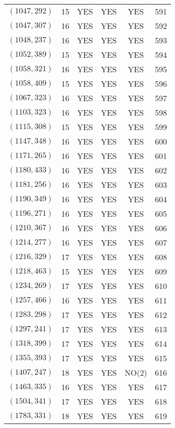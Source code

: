 \begin{longtable}{|c|c|c|c|c|c|}
$(1047, 292)$ & 15 & YES & YES & YES & 591\\
$(1047, 307)$ & 16 & YES & YES & YES & 592\\
$(1048, 237)$ & 16 & YES & YES & YES & 593\\
$(1052, 389)$ & 15 & YES & YES & YES & 594\\
$(1058, 321)$ & 16 & YES & YES & YES & 595\\
$(1058, 409)$ & 15 & YES & YES & YES & 596\\
$(1067, 323)$ & 16 & YES & YES & YES & 597\\
$(1103, 323)$ & 16 & YES & YES & YES & 598\\
$(1115, 308)$ & 15 & YES & YES & YES & 599\\
$(1147, 348)$ & 16 & YES & YES & YES & 600\\
$(1171, 265)$ & 16 & YES & YES & YES & 601\\
$(1180, 433)$ & 16 & YES & YES & YES & 602\\
$(1181, 256)$ & 16 & YES & YES & YES & 603\\
$(1190, 349)$ & 16 & YES & YES & YES & 604\\
$(1196, 271)$ & 16 & YES & YES & YES & 605\\
$(1210, 367)$ & 16 & YES & YES & YES & 606\\
$(1214, 277)$ & 16 & YES & YES & YES & 607\\
$(1216, 329)$ & 17 & YES & YES & YES & 608\\
$(1218, 463)$ & 15 & YES & YES & YES & 609\\
$(1234, 269)$ & 17 & YES & YES & YES & 610\\
$(1257, 466)$ & 16 & YES & YES & YES & 611\\
$(1283, 298)$ & 17 & YES & YES & YES & 612\\
$(1297, 241)$ & 17 & YES & YES & YES & 613\\
$(1318, 399)$ & 17 & YES & YES & YES & 614\\
$(1355, 393)$ & 17 & YES & YES & YES & 615\\
$(1407, 247)$ & 18 & YES & YES & NO(2) & 616\\
$(1463, 335)$ & 16 & YES & YES & YES & 617\\
$(1504, 341)$ & 17 & YES & YES & YES & 618\\
$(1783, 331)$ & 18 & YES & YES & YES & 619
\end{longtable}
